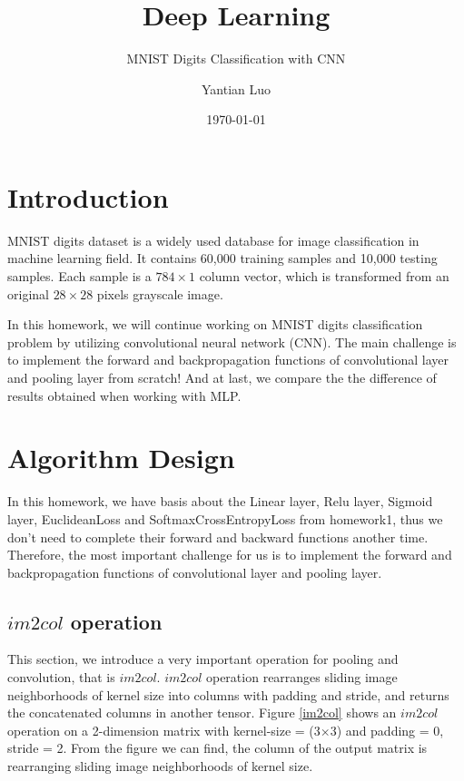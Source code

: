 \documentclass{elegantbook}
\title{Deep Learning}
\subtitle{MNIST Digits Classification with CNN}
\author{Yantian Luo}
\institute{Electronic Engineering}
\date{\today}
\begin{document}
\maketitle
\tableofcontents
\mainmatter
\hypersetup{pageanchor=true}
\chapter{Introduction}
MNIST digits dataset is a widely used database for image classification in machine learning field. It contains 60,000 training samples and 10,000 testing samples. Each sample is a $784\times1$ column vector, which is transformed from an original $28\times28$ pixels grayscale image.

In this homework, we will continue working on MNIST digits classification problem by utilizing convolutional neural network (CNN). The main challenge is to implement the forward and backpropagation functions of convolutional layer and pooling layer from scratch! And at last, we compare the the difference of results obtained when working with MLP.

\chapter{Algorithm Design}
In this homework, we have basis about the Linear layer, Relu layer, Sigmoid layer, EuclideanLoss and SoftmaxCrossEntropyLoss from homework1, thus we don't need to complete their forward and backward functions another time. Therefore, the most important challenge for us is to implement the forward and backpropagation functions of convolutional layer and
pooling layer.

\section{$im2col$ operation}
This section, we introduce a very important operation for pooling and convolution, that is $im2col$. $im2col$ operation rearranges sliding image neighborhoods of kernel size into columns with padding and stride, and returns the concatenated columns in another tensor. Figure \ref{im2col} shows  an $im2col$ operation on a 2-dimension matrix with kernel-size = (3$\times$3) and padding = 0, stride = 2. From the figure we can find, the column of the output matrix is rearranging sliding image neighborhoods of kernel size. 
\end{document}
